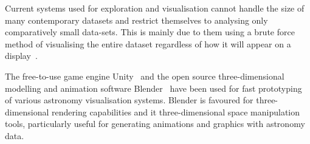 Current systems used for exploration and visualisation cannot handle the size of many contemporary datasets and restrict themselves to analysing only comparatively small data-sets.
This is mainly due to them using a brute force method of visualising the entire dataset regardless of how it will appear on a display~\cite{Bikakis2018}.

The free-to-use game engine Unity~\cite{Marchetti2020, Ferrand2016, Ferrand2018} and the open source three-dimensional modelling and animation software Blender~\cite{Taylor2015, Taylor2016, Kent2013, Naiman2016} have been used for fast prototyping of various astronomy visualisation systems.
Blender is favoured for three-dimensional rendering capabilities and it three-dimensional space manipulation tools,
particularly useful for generating animations and graphics with astronomy data.

